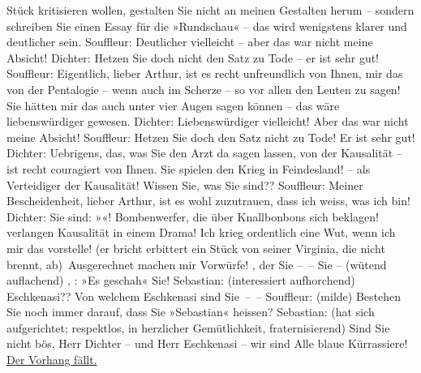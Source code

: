 \begin{ledgroupsized}[t]{13cm}
					Stück kritisieren wollen, gestalten Sie nicht an meinen Gestalten herum –
					sondern schreiben Sie einen Essay für die »Rundschau« – das wird wenigstens klarer und deutlicher sein.\pend
           \pstart
           Souffleur: Deutlicher vielleicht – aber das war nicht meine Absicht!\pend
           \pstart
           Dichter: Hetzen Sie doch nicht den Satz zu Tode – er ist sehr gut!\pend
           \pstart
           Souffleur: Eigentlich, lieber Arthur, ist es recht unfreundlich von Ihnen, mir
					das von der Pentalogie – wenn auch im Scherze – so vor allen den Leuten zu
					sagen! Sie hätten mir das auch unter vier Augen sagen können – das wäre
					liebenswürdiger gewesen.\pend
           \pstart
           Dichter: Liebenswürdiger vielleicht! Aber das war nicht meine Absicht!\pend
           \pstart
           Souffleur: Hetzen Sie doch den Satz nicht zu Tode! Er ist sehr gut!\pend
           \pstart
           Dichter: Uebrigens, das, was Sie den Arzt da sagen lassen, von der Kausalität –
					ist recht couragiert von Ihnen. Sie spielen den Krieg in Feindesland!  – als Verteidiger der Kausalität! Wissen Sie, was
					Sie sind??\pend
           \pstart
           Souffleur: Meiner Bescheiden\introOben{}heit\introOben{}, lieber Arthur, ist es
					wohl zuzutrauen, dass ich weiss, was ich bin!\pend
           \pstart
           Dichter: Sie sind: »\label{K_L01900_1v}\label{K_L01900_1h}«! Bombenwerfer, die über Knallbonbons sich beklagen!  verlangen Kausalität in einem Drama! Ich krieg
					ordentlich eine Wut, wenn ich mir das vorstelle! (er bricht erbittert ein Stück
					von seiner Virginia, die nicht brennt, ab) Ausgerechnet  machen mir Vorwürfe! {\pb}, der Sie – – Sie – (wütend auflachend) \so{Sie}, : »Es geschah«
					Sie!\pend
           \pstart
           Sebastian: (interessiert aufhorchend) Eschkenasi?? Von welchem Eschkenasi sind
					Sie – –\pend
           \pstart
           Souffleur: (milde) Bestehen Sie noch immer darauf, dass Sie  »Sebastian« heissen?\pend
           \pstart
           Sebastian: (hat sich aufgerichtet; respektlos, in herzlicher Gemütlichkeit,
					fraternisierend) Sind Sie nicht bös, Herr Dichter – und Herr Eschkenasi – wir
					sind Alle blaue Kürrassiere!\pend
           \pstart
           \centering{}\uline{Der Vorhang fällt.}\pend
           \endnumbering{}\end{ledgroupsized}  \newcommand{\dateiname}{L01900}\newcommand{\titel}{Richard Beer-Hofmann an Arthur Schnitzler, [13. 12. 1909?]}\newcommand{\editorInnen}{Martin Anton Müller und Gerd-Hermann Susen}
      